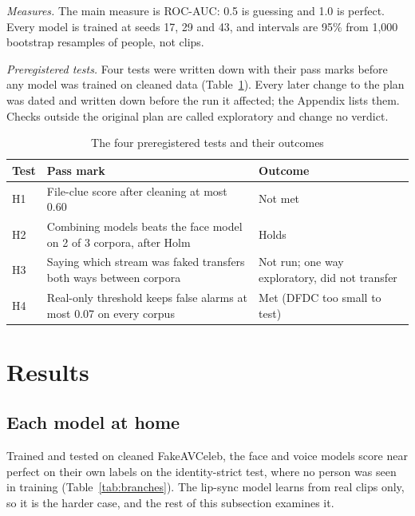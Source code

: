 \documentclass[conference]{IEEEtran}
\begin{document}
\textit{Measures.} The main measure is ROC-AUC: 0.5 is guessing and 1.0 is
perfect. Every model is trained at seeds 17, 29 and 43, and intervals are 95\%
from 1,000 bootstrap resamples of people, not clips.

\textit{Preregistered tests.} Four tests were written down with their pass
marks before any model was trained on cleaned data (Table~\ref{tab:tests}).
Every later change to the plan was dated and written down before the run it
affected; the Appendix lists them. Checks outside the original plan are called exploratory and change no
verdict.

\begin{table}[htbp]
\caption{The four preregistered tests and their outcomes}
\label{tab:tests}
\centering
\small
\begin{tabular}{@{}l>{\raggedright\arraybackslash}p{3.6cm}>{\raggedright\arraybackslash}p{2.6cm}@{}}
\toprule
Test & Pass mark & Outcome \\
\midrule
H1 & File-clue score after cleaning at most 0.60 & Not met \\
H2 & Combining models beats the face model on 2 of 3 corpora, after Holm & Holds \\
H3 & Saying which stream was faked transfers both ways between corpora & Not run; one
way exploratory, did not transfer \\
H4 & Real-only threshold keeps false alarms at most 0.07 on every corpus & Met (DFDC too
small to test) \\
\bottomrule
\end{tabular}
\end{table}

\section{Results}
\label{sec:results}

\subsection{Each model at home}
\label{sec:home}

Trained and tested on cleaned FakeAVCeleb, the face and voice models score
near perfect on their own labels on the identity-strict test, where no
person was seen in training (Table~\ref{tab:branches}). The lip-sync model
learns from real clips only, so it is the harder case, and the rest of this
subsection examines it.
\end{document}
